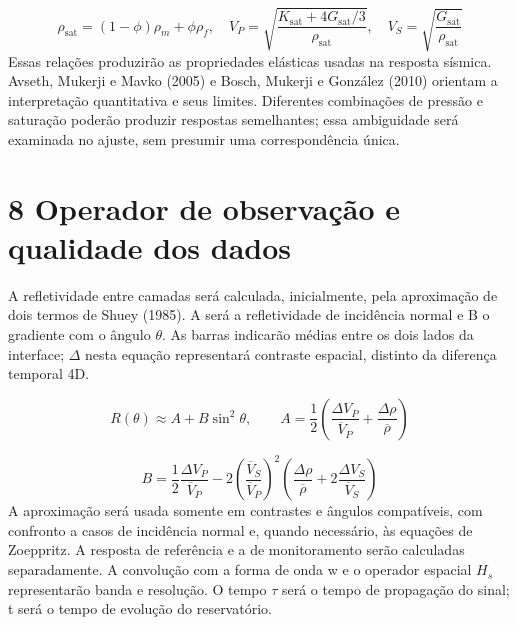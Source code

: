 \documentclass[12pt,a4paper]{article}
\begin{document}
\begin{equation}
\rho_{\mathrm{sat}}=(1-\phi)\rho_m+\phi\rho_f,\quad V_P=\sqrt{\frac{K_{\mathrm{sat}}+4G_{\mathrm{sat}}/3}{\rho_{\mathrm{sat}}}},\quad V_S=\sqrt{\frac{G_{\mathrm{sat}}}{\rho_{\mathrm{sat}}}}
\end{equation}
Essas relações produzirão as propriedades elásticas usadas na resposta sísmica. Avseth, Mukerji e Mavko (2005) e Bosch, Mukerji e González (2010) orientam a interpretação quantitativa e seus limites. Diferentes combinações de pressão e saturação poderão produzir respostas semelhantes; essa ambiguidade será examinada no ajuste, sem presumir uma correspondência única.\par

\newpage
\section*{8 Operador de observação e qualidade dos dados}
A refletividade entre camadas será calculada, inicialmente, pela aproximação de dois termos de Shuey (1985). A será a refletividade de incidência normal e B o gradiente com o ângulo \(\theta\). As barras indicarão médias entre os dois lados da interface; \(\Delta\) nesta equação representará contraste espacial, distinto da diferença temporal 4D.\par

\begin{equation}
R(\theta)\approx A+B\sin^2\theta,\qquad A=\frac12\left(\frac{\Delta V_P}{\overline V_P}+\frac{\Delta\rho}{\overline\rho}\right)
\end{equation}

\begin{equation}
B=\frac12\frac{\Delta V_P}{\overline V_P}-2\left(\frac{\overline V_S}{\overline V_P}\right)^2\left(\frac{\Delta\rho}{\overline\rho}+2\frac{\Delta V_S}{\overline V_S}\right)
\end{equation}
A aproximação será usada somente em contrastes e ângulos compatíveis, com confronto a casos de incidência normal e, quando necessário, às equações de Zoeppritz. A resposta de referência e a de monitoramento serão calculadas separadamente. A convolução com a forma de onda w e o operador espacial \(H_{s}\) representarão banda e resolução. O tempo \(\tau\) será o tempo de propagação do sinal; t será o tempo de evolução do reservatório.\par
\end{document}
